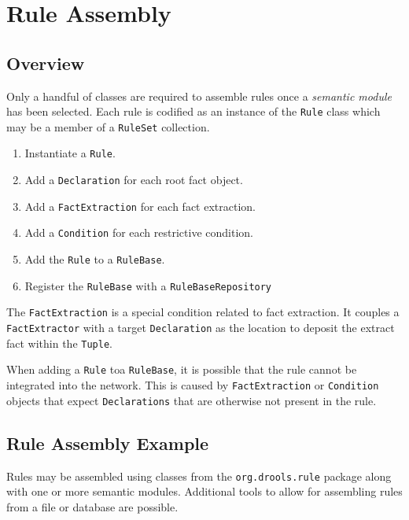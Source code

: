
\chapter{Rule Assembly}

\section{Overview}

Only a handful of classes are required to assemble rules once a
\emph{semantic module} has been selected.  Each rule is codified as an
instance of the \verb|Rule| class which may be a member of a
\verb|RuleSet| collection.  

\begin{enumerate}
	\item Instantiate a \verb|Rule|.
	\item Add a \verb|Declaration| for each root fact object.
	\item Add a \verb|FactExtraction| for each fact extraction.
	\item Add a \verb|Condition| for each restrictive condition.
	\item Add the \verb|Rule| to a \verb|RuleBase|.
	\item Register the \verb|RuleBase| with a \verb|RuleBaseRepository|
\end{enumerate}

The \verb|FactExtraction| is a special condition related to
fact extraction.  It couples a \verb|FactExtractor| with a target
\verb|Declaration| as the location to deposit the extract fact
within the \verb|Tuple|.

When adding a \verb|Rule| toa  \verb|RuleBase|, it is possible that
the rule cannot be integrated into the network.  This is caused
by \verb|FactExtraction| or \verb|Condition| objects that expect
\verb|Declarations| that are otherwise not present in the rule.

\newpage

\section{Rule Assembly Example}

Rules may be assembled using classes from the \verb|org.drools.rule|
package along with one or more semantic modules.  Additional tools
to allow for assembling rules from a file or database are possible.

